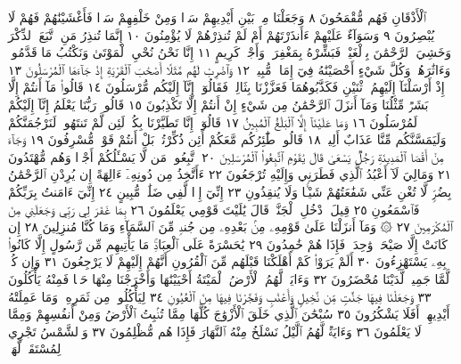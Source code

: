 ٱلْأَذْقَانِ فَهُم مُّقْمَحُونَ ٨ وَجَعَلْنَا مِنۢ بَيْنِ أَيْدِيهِمْ سَدࣰّا
وَمِنْ خَلْفِهِمْ سَدࣰّا فَأَغْشَيْنَٰهُمْ فَهُمْ لَا يُبْصِرُونَ ٩ وَسَوَآءٌ
عَلَيْهِمْ ءَأَنذَرْتَهُمْ أَمْ لَمْ تُنذِرْهُمْ لَا يُؤْمِنُونَ ١٠ إِنَّمَا تُنذِرُ
مَنِ ٱتَّبَعَ ٱلذِّكْرَ وَخَشِيَ ٱلرَّحْمَٰنَ بِٱلْغَيْبِۖ فَبَشِّرْهُ بِمَغْفِرَةࣲ
وَأَجْرࣲ كَرِيمٍ ١١ إِنَّا نَحْنُ نُحْيِ ٱلْمَوْتَىٰ وَنَكْتُبُ مَا قَدَّمُوا۟
وَءَاثَٰرَهُمْۚ وَكُلَّ شَيْءٍ أَحْصَيْنَٰهُ فِيٓ إِمَامࣲ مُّبِينࣲ ١٢
وَٱضْرِبْ لَهُم مَّثَلًا أَصْحَٰبَ ٱلْقَرْيَةِ إِذْ جَآءَهَا ٱلْمُرْسَلُونَ ١٣
إِذْ أَرْسَلْنَآ إِلَيْهِمُ ٱثْنَيْنِ فَكَذَّبُوهُمَا فَعَزَّزْنَا بِثَالِثࣲ فَقَالُوٓا۟
إِنَّآ إِلَيْكُم مُّرْسَلُونَ ١٤ قَالُوا۟ مَآ أَنتُمْ إِلَّا بَشَرࣱ مِّثْلُنَا
وَمَآ أَنزَلَ ٱلرَّحْمَٰنُ مِن شَيْءٍ إِنْ أَنتُمْ إِلَّا تَكْذِبُونَ ١٥ قَالُوا۟
رَبُّنَا يَعْلَمُ إِنَّآ إِلَيْكُمْ لَمُرْسَلُونَ ١٦ وَمَا عَلَيْنَآ إِلَّا ٱلْبَلَٰغُ
ٱلْمُبِينُ ١٧ قَالُوٓا۟ إِنَّا تَطَيَّرْنَا بِكُمْۖ لَئِن لَّمْ تَنتَهُوا۟ لَنَرْجُمَنَّكُمْ
وَلَيَمَسَّنَّكُم مِّنَّا عَذَابٌ أَلِيمࣱ ١٨ قَالُوا۟ طَٰٓئِرُكُم مَّعَكُمْ أَئِن
ذُكِّرْتُمۚ بَلْ أَنتُمْ قَوْمࣱ مُّسْرِفُونَ ١٩ وَجَآءَ مِنْ أَقْصَا ٱلْمَدِينَةِ
رَجُلࣱ يَسْعَىٰ قَالَ يَٰقَوْمِ ٱتَّبِعُوا۟ ٱلْمُرْسَلِينَ ٢٠ ٱتَّبِعُوا۟
مَن لَّا يَسْـَٔلُكُمْ أَجْرࣰا وَهُم مُّهْتَدُونَ ٢١ وَمَالِيَ لَآ أَعْبُدُ
ٱلَّذِي فَطَرَنِي وَإِلَيْهِ تُرْجَعُونَ ٢٢ ءَأَتَّخِذُ مِن دُونِهِۦٓ ءَالِهَةً
إِن يُرِدْنِ ٱلرَّحْمَٰنُ بِضُرࣲّ لَّا تُغْنِ عَنِّي شَفَٰعَتُهُمْ شَيْـࣰٔا
وَلَا يُنقِذُونِ ٢٣ إِنِّيٓ إِذࣰا لَّفِي ضَلَٰلࣲ مُّبِينٍ ٢٤ إِنِّيٓ ءَامَنتُ
بِرَبِّكُمْ فَٱسْمَعُونِ ٢٥ قِيلَ ٱدْخُلِ ٱلْجَنَّةَۖ قَالَ يَٰلَيْتَ قَوْمِي
يَعْلَمُونَ ٢٦ بِمَا غَفَرَ لِي رَبِّي وَجَعَلَنِي مِنَ ٱلْمُكْرَمِينَ ٢٧
۞ وَمَآ أَنزَلْنَا عَلَىٰ قَوْمِهِۦ مِنۢ بَعْدِهِۦ مِن جُندࣲ مِّنَ ٱلسَّمَآءِ وَمَا كُنَّا
مُنزِلِينَ ٢٨ إِن كَانَتْ إِلَّا صَيْحَةࣰ وَٰحِدَةࣰ فَإِذَا هُمْ خَٰمِدُونَ ٢٩
يَٰحَسْرَةً عَلَى ٱلْعِبَادِۚ مَا يَأْتِيهِم مِّن رَّسُولٍ إِلَّا كَانُوا۟ بِهِۦ
يَسْتَهْزِءُونَ ٣٠ أَلَمْ يَرَوْا۟ كَمْ أَهْلَكْنَا قَبْلَهُم مِّنَ ٱلْقُرُونِ
أَنَّهُمْ إِلَيْهِمْ لَا يَرْجِعُونَ ٣١ وَإِن كُلࣱّ لَّمَّا جَمِيعࣱ لَّدَيْنَا مُحْضَرُونَ ٣٢
وَءَايَةࣱ لَّهُمُ ٱلْأَرْضُ ٱلْمَيْتَةُ أَحْيَيْنَٰهَا وَأَخْرَجْنَا مِنْهَا حَبࣰّا
فَمِنْهُ يَأْكُلُونَ ٣٣ وَجَعَلْنَا فِيهَا جَنَّٰتࣲ مِّن نَّخِيلࣲ
وَأَعْنَٰبࣲ وَفَجَّرْنَا فِيهَا مِنَ ٱلْعُيُونِ ٣٤ لِيَأْكُلُوا۟ مِن ثَمَرِهِۦ
وَمَا عَمِلَتْهُ أَيْدِيهِمْۚ أَفَلَا يَشْكُرُونَ ٣٥ سُبْحَٰنَ ٱلَّذِي
خَلَقَ ٱلْأَزْوَٰجَ كُلَّهَا مِمَّا تُنۢبِتُ ٱلْأَرْضُ وَمِنْ أَنفُسِهِمْ
وَمِمَّا لَا يَعْلَمُونَ ٣٦ وَءَايَةࣱ لَّهُمُ ٱلَّيْلُ نَسْلَخُ مِنْهُ ٱلنَّهَارَ
فَإِذَا هُم مُّظْلِمُونَ ٣٧ وَٱلشَّمْسُ تَجْرِي لِمُسْتَقَرࣲّ لَّهَاۚ
